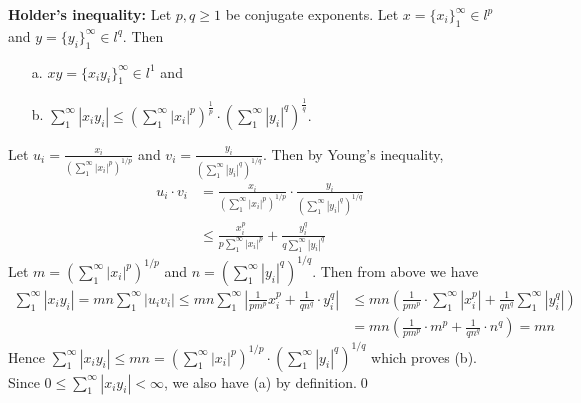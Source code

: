 
\begin{solution}
    
    \textbf{Holder's inequality:}
    Let $p,q \geq 1$ be conjugate exponents. Let
    $x=\{x_{i}\}_{1}^{\infty}\in l^{p}$
    and $y=\{y_{i}\}_{1}^{\infty}\in l^{q}$. Then
    \begin{enumerate}
      \item[a.]
            $xy=\{x_{i}y_{i}\}_{1}^{\infty} \in l^{1}$ and
      \item[b.]
            $\sum_{1}^{\infty}{|x_{i}y_{i}|}\leq
            (\sum_{1}^{\infty}{|x_{i}|^{p}})^{\frac{1}{p}}
            \cdot
            (\sum_{1}^{\infty}{|y_{i}|^{q}})^{\frac{1}{q}}.$
  \end{enumerate}
    Let $u_i=\frac{x_i}{\left(\sum_{1}^{\infty}
    {|x_i|^{p}}\right)^{1/p}}$ and 
    $v_i=\frac{y_i}{\left(\sum_{1}^{\infty}
    {|y_i|^{q}}\right)^{1/q}}$. Then by Young's inequality,
    \begin{align*}
        u_{i}\cdot v_{i} &= \frac{x_i}{
            \left(\sum_{1}^{\infty}
            {|x_i|^{p}}\right)^{1/p}
            }
            \cdot \frac{y_i}{\left(\sum_{1}^{\infty}
            {|y_i|^{q}}\right)^{1/q}}\\
            &\leq \frac{x_i^p}{
            p\sum_{1}^{\infty}
            {|x_i|^{p}}
            } +
            \frac{y_i^q}{q\sum_{1}^{\infty}
            {|y_i|^{q}}}
    \end{align*}
    Let $m = \left(\sum_{1}^{\infty}{|x_i|^{p}}\right)^{1/p}$
    and $n = \left(\sum_{1}^{\infty}{|y_i|^{q}}\right)^{1/q}$.
    Then from above we have
    \begin{align*}
        \sum_{1}^{\infty}{|x_{i}y_{i}|} = 
    mn\sum_{1}^{\infty}{|u_{i}v_{i}|} \leq
    mn\sum_1^\infty{\left|\frac{1}{pm^p}x_i^p +
    \frac{1}{qn^q}\cdot y_i^q\right|}&\leq mn\left(\frac{1}{pm^p}
    \cdot\sum_1^\infty\left|x_i^p\right|+\frac{1}{qn^q}
    \sum_1^\infty\left|y_i^q\right|\right)\\
    &=mn\left(\frac{1}{pm^p}\cdot m^p +\frac{1}{qn^q}\cdot n^q
    \right) = mn
    \end{align*}
    Hence $\sum_{1}^{\infty}{|x_{i}y_{i}|}\leq mn = 
    \left(\sum_{1}^{\infty}{|x_i|^{p}}\right)^{1/p}\cdot
    \left(\sum_{1}^{\infty}{|y_i|^{q}}\right)^{1/q}$ which proves
    (b). Since $0\leq\sum_{1}^{\infty}{|x_{i}y_{i}|}<\infty$, we also
    have (a) by definition.\qed
\end{solution}